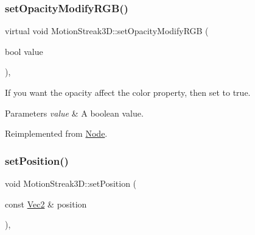 \mbox{\label{classMotionStreak3D_ad201e04b841b5fb15fea56bfd6b9cb03}} 
\subsubsection{\texorpdfstring{set\+Opacity\+Modify\+R\+G\+B()}{setOpacityModifyRGB()}\hspace{0.1cm}{\footnotesize\ttfamily [2/2]}}
{\footnotesize\ttfamily virtual void Motion\+Streak3\+D\+::set\+Opacity\+Modify\+R\+GB (\begin{DoxyParamCaption}\item[{bool}]{value }\end{DoxyParamCaption})\hspace{0.3cm}{\ttfamily [override]}, {\ttfamily [virtual]}}

If you want the opacity affect the color property, then set to true. 
\begin{DoxyParams}{Parameters}
{\em value} & A boolean value. \\
\hline
\end{DoxyParams}


Reimplemented from \hyperlink{classNode_a978c5435ab23f76e9efdf0f7e9e288e5}{Node}.

\mbox{\label{classMotionStreak3D_a8e4698c3850e094f90600e3ba4604651}} 
\subsubsection{\texorpdfstring{set\+Position()}{setPosition()}\hspace{0.1cm}{\footnotesize\ttfamily [1/4]}}
{\footnotesize\ttfamily void Motion\+Streak3\+D\+::set\+Position (\begin{DoxyParamCaption}\item[{const \hyperlink{classVec2}{Vec2} \&}]{position }\end{DoxyParamCaption})\hspace{0.3cm}{\ttfamily [override]}, {\ttfamily [virtual]}}




